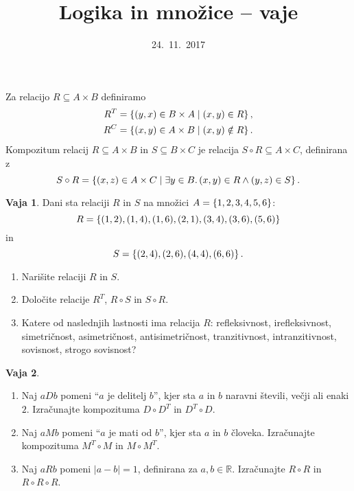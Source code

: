\documentclass{article}
\newcommand{\some}[1]{\exists #1 .\,}
\newcommand{\RR}{\mathbb{R}}
\theoremstyle{definition}
\newtheorem{vaja}{Vaja}
\begin{document}
\title{Logika in množice -- vaje}
\date{24.~11.~2017}
\maketitle

\bigskip

\noindent
Za relacijo $R \subseteq A \times B$ definiramo
%
\begin{align*}
  R^T &= \set{(y,x) \in B \times A}{(x,y) \in R},\\
  R^C &= \set{(x,y) \in A \times B}{(x,y) \notin R}.
\end{align*}
%
Kompozitum relacij $R \subseteq A \times B$ in $S \subseteq B \times
C$ je relacija $S \circ R \subseteq A \times C$, definirana z
%
\begin{equation*}
  S \circ R = \set{(x,z) \in A \times C}{\some{y \in B}{(x,y) \in R \land (y,z) \in S}}.
\end{equation*}

\bigskip\bigskip

\begin{vaja}
  Dani sta relaciji $R$ in $S$ na množici $A = \set{1,2,3,4,5,6}$:
  \[R = \set{(1,2),(1,4),(1,6),(2,1),(3,4),(3,6),(5,6)}\]
  in
  \[S = \set{(2,4),(2,6),(4,4),(6,6)}.\]
  \begin{enumerate}
    \item
      Narišite relaciji $R$ in $S$.
    \item
      Določite relacije $R^T$, $R \circ S$ in $S \circ R$.
    \item
      Katere od naslednjih lastnosti ima relacija $R$: refleksivnost, irefleksivnost, simetričnost, asimetričnost, antisimetričnost, tranzitivnost, intranzitivnost, sovisnost, strogo sovisnost?
  \end{enumerate}
\end{vaja}

\begin{vaja}
  \
  \begin{enumerate}
    \item
      Naj $a D b$ pomeni "`$a$ je delitelj $b$"', kjer sta $a$ in $b$ naravni števili, večji ali enaki $2$. Izračunajte kompozituma $D \circ D^T$ in $D^T \circ D$.
    \item
      Naj $a M b$ pomeni "`$a$ je mati od $b$"', kjer sta $a$ in $b$ človeka. Izračunajte kompozituma $M^T \circ M$ in $M \circ M^T$.
    \item
      Naj $a R b$ pomeni $|a - b| = 1$, definirana za $a, b \in \RR$. Izračunajte $R \circ R$ in $R \circ R \circ R$.
  \end{enumerate}
\end{vaja}
\end{document}
